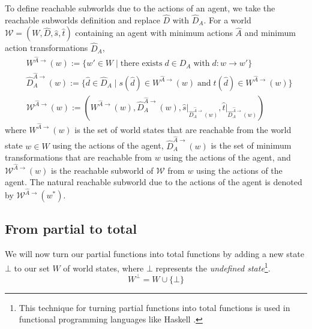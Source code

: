 To define reachable subworlds due to the actions of an agent, we take the reachable subworlds definition and replace $\hat{D}$ with $\hat{D}_{A}$.
For a world $\mathscr{W} = (W, \hat{D}, \hat{s}, \hat{t})$ containing an agent with minimum actions $\hat{A}$ and minimum action transformations $\hat{D}_{A}$,
\begin{align}
	 & W^{\hat{A}\to}(w) := \{ w' \in W \mid \text{there exists} \; d \in D_{A} \; \text{with} \; d: w \to w' \}                                                                 \\
	 & \hat{D}_{A}^{\hat{A}\to}(w) := \{ \hat{d} \in \hat{D}_{A} \mid s(\hat{d}) \in W^{\hat{A}\to}(w) \; \text{and} \; t(\hat{d}) \in W^{\hat{A}\to}(w) \}                      \\
	 & \mathscr{W}^{\hat{A}\to}(w) := (W^{\hat{A}\to}(w), \hat{D}_{A}^{\hat{A}\to}(w), \hat{s} \big|_{\hat{D}_{A}^{\hat{A}\to}(w)}, \hat{t} \big|_{\hat{D}_{A}^{\hat{A}\to}(w)})
\end{align}
where $W^{\hat{A}\to}(w)$ is the set of world states that are reachable from the world state $w \in W$ using the actions of the agent, $\hat{D}_{A}^{\hat{A}\to}(w)$ is the set of minimum transformations that are reachable from $w$ using the actions of the agent, and $\mathscr{W}^{\hat{A}\to}(w)$ is the reachable subworld of $\mathscr{W}$ from $w$ using the actions of the agent.
The natural reachable subworld due to the actions of the agent is denoted by $\mathscr{W}^{\hat{A}\to}(w^{*})$.


\subsection{From partial to total}

We will now turn our partial functions into total functions by adding a new state $\bot$ to our set $W$ of world states, where $\bot$ represents the \emph{undefined state}\footnote{
	This technique for turning partial functions into total functions is used in functional programming languages like Haskell .
}.
\begin{equation}
	W^{\bot} = W \cup \{ \bot \}
\end{equation}

